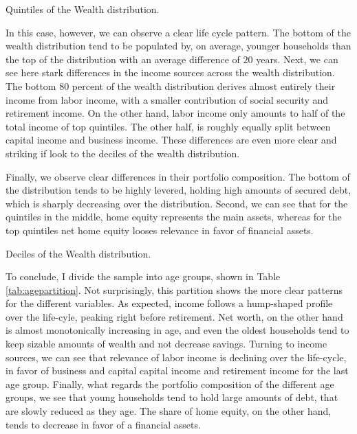 \documentclass[11pt, a4paper, leqno]{article}
\begin{document}
\begin{table}[h]
    \caption{Quintiles of the Wealth distribution.}
    \resizebox{\textwidth}{!}{}
    \label{tab:quintilesnetworth}
\end{table}

In this case, however, we can observe a clear life cycle pattern. The bottom of the wealth distribution tend to be populated by, on average, younger households than the top of the distribution with an average difference of $20$ years. Next, we can see here stark differences in the income sources across the wealth distribution. The bottom $80$ percent of the wealth distribution derives almost entirely their income from labor income, with a smaller contribution of social security and retirement income. On the other hand, labor income only amounts to half of the total income of top quintiles. The other half, is roughly equally split between capital income and business income. These differences are even more clear and striking if look to the deciles of the wealth distribution.

Finally, we observe clear differences in their portfolio composition. The bottom of the distribution tends to be highly levered, holding high amounts of secured debt, which is sharply decreasing over the distribution. Second, we can see that for the quintiles in the middle, home equity represents the main assets, whereas for the top quintiles net home equity looses relevance in favor of financial assets.

\begin{table}[h]
    \caption{Deciles of the Wealth distribution.}
    \resizebox{\textwidth}{!}{}
    \label{tab:decilesnetworth}
\end{table}

To conclude, I divide the sample into age groups, shown in Table \ref*{tab:agepartition}. Not surprisingly, this partition shows the more clear patterns for the different variables. As expected, income follows a hump-shaped profile over the life-cyle, peaking right before retirement. Net worth, on the other hand is almost monotonically increasing in age, and even the oldest households tend to keep sizable amounts of wealth and not decrease savings. Turning to income sources, we can see that relevance of labor income is declining over the life-cycle, in favor of business and capital capital income and retirement income for the last age group. Finally, what regards the portfolio composition of the different age groups, we see that young households tend to hold large amounts of debt, that are slowly reduced as they age. The share of home equity, on the other hand, tends to decrease in favor of a financial assets.
\end{document}
